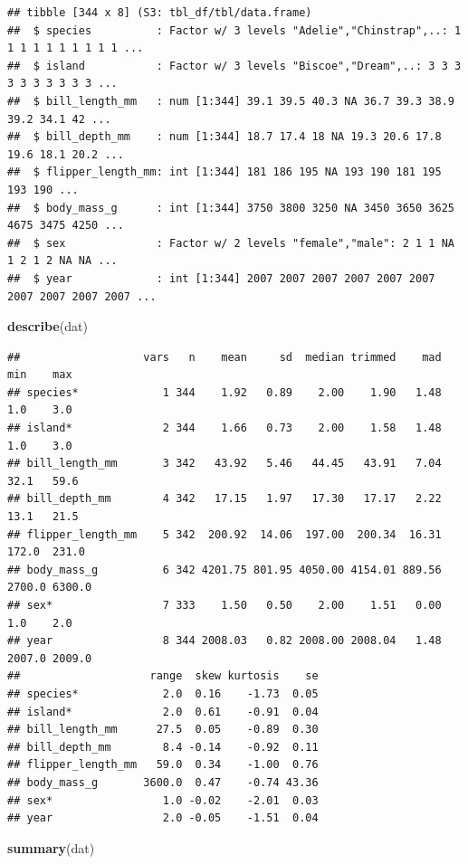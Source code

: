 \documentclass[
]{book}
\newenvironment{Shaded}{\begin{snugshade}}{\end{snugshade}}
\newcommand{\FunctionTok}[1]{\textcolor[rgb]{0.13,0.29,0.53}{\textbf{#1}}}
\newcommand{\NormalTok}[1]{#1}
\begin{document}
\begin{verbatim}
## tibble [344 x 8] (S3: tbl_df/tbl/data.frame)
##  $ species          : Factor w/ 3 levels "Adelie","Chinstrap",..: 1 1 1 1 1 1 1 1 1 1 ...
##  $ island           : Factor w/ 3 levels "Biscoe","Dream",..: 3 3 3 3 3 3 3 3 3 3 ...
##  $ bill_length_mm   : num [1:344] 39.1 39.5 40.3 NA 36.7 39.3 38.9 39.2 34.1 42 ...
##  $ bill_depth_mm    : num [1:344] 18.7 17.4 18 NA 19.3 20.6 17.8 19.6 18.1 20.2 ...
##  $ flipper_length_mm: int [1:344] 181 186 195 NA 193 190 181 195 193 190 ...
##  $ body_mass_g      : int [1:344] 3750 3800 3250 NA 3450 3650 3625 4675 3475 4250 ...
##  $ sex              : Factor w/ 2 levels "female","male": 2 1 1 NA 1 2 1 2 NA NA ...
##  $ year             : int [1:344] 2007 2007 2007 2007 2007 2007 2007 2007 2007 2007 ...
\end{verbatim}

\begin{Shaded}
\begin{Highlighting}[]
\FunctionTok{describe}\NormalTok{(dat)}
\end{Highlighting}
\end{Shaded}

\begin{verbatim}
##                   vars   n    mean     sd  median trimmed    mad    min    max
## species*             1 344    1.92   0.89    2.00    1.90   1.48    1.0    3.0
## island*              2 344    1.66   0.73    2.00    1.58   1.48    1.0    3.0
## bill_length_mm       3 342   43.92   5.46   44.45   43.91   7.04   32.1   59.6
## bill_depth_mm        4 342   17.15   1.97   17.30   17.17   2.22   13.1   21.5
## flipper_length_mm    5 342  200.92  14.06  197.00  200.34  16.31  172.0  231.0
## body_mass_g          6 342 4201.75 801.95 4050.00 4154.01 889.56 2700.0 6300.0
## sex*                 7 333    1.50   0.50    2.00    1.51   0.00    1.0    2.0
## year                 8 344 2008.03   0.82 2008.00 2008.04   1.48 2007.0 2009.0
##                    range  skew kurtosis    se
## species*             2.0  0.16    -1.73  0.05
## island*              2.0  0.61    -0.91  0.04
## bill_length_mm      27.5  0.05    -0.89  0.30
## bill_depth_mm        8.4 -0.14    -0.92  0.11
## flipper_length_mm   59.0  0.34    -1.00  0.76
## body_mass_g       3600.0  0.47    -0.74 43.36
## sex*                 1.0 -0.02    -2.01  0.03
## year                 2.0 -0.05    -1.51  0.04
\end{verbatim}

\begin{Shaded}
\begin{Highlighting}[]
\FunctionTok{summary}\NormalTok{(dat)}
\end{Highlighting}
\end{Shaded}
\end{document}

